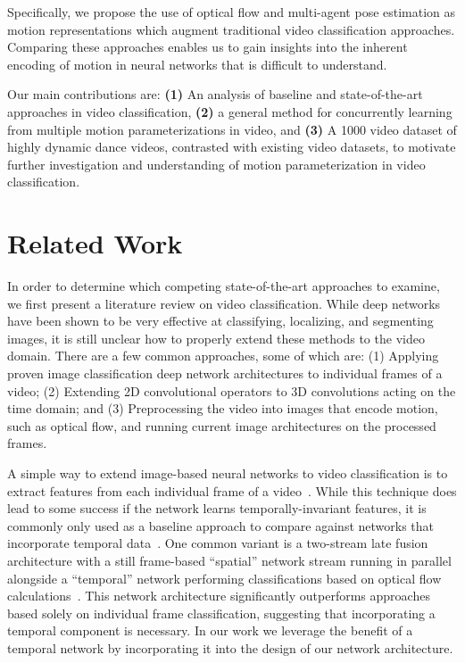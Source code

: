\documentclass[10pt,twocolumn,letterpaper]{article}
\begin{document}
Specifically, we propose the use of optical flow and multi-agent pose estimation as motion representations which augment traditional video classification approaches. Comparing these approaches enables us to gain insights into the inherent encoding of motion in neural networks that is difficult to understand.

Our main contributions are: \textbf{(1)} An analysis of baseline and state-of-the-art approaches in video classification, \textbf{(2)} a general method for concurrently learning from multiple motion parameterizations in video, and \textbf{(3)} A 1000 video dataset of highly dynamic dance videos, contrasted with existing video datasets, to motivate further investigation and understanding of motion parameterization in video classification.

\section{\label{sec:related}Related Work}

In order to determine which competing state-of-the-art approaches to examine, we first present a literature review on video classification. While deep networks have been shown to be very effective at classifying, localizing, and segmenting images, it is still unclear how to properly extend these methods to the video domain. There are a few common approaches, some of which are: (1) Applying proven image classification deep network architectures to individual frames of a video; (2) Extending 2D convolutional operators to 3D convolutions acting on the time domain;  and (3) Preprocessing the video into images that encode motion, such as optical flow, and running current image architectures on the processed frames.

A simple way to extend image-based neural networks to video classification is to extract features from each individual frame of a video~\cite{NIPS2012_4730}. While this technique does lead to some success if the network learns temporally-invariant features, it is commonly only used as a baseline approach to compare against networks that incorporate temporal data~\cite{6165309,Karpathy_2014_CVPR}. One common variant is a two-stream late fusion architecture with a still frame-based ``spatial'' network stream running in parallel alongside a ``temporal'' network performing classifications based on optical flow calculations~\cite{cheron2015p,feichtenhofer2016convolutional,gkioxari2015finding,NIPS2014_5353}. This network architecture significantly outperforms approaches based solely on individual frame classification, suggesting that incorporating a temporal component is necessary. In our work we leverage the benefit of a temporal network by incorporating it into the design of our network architecture.
\end{document}
